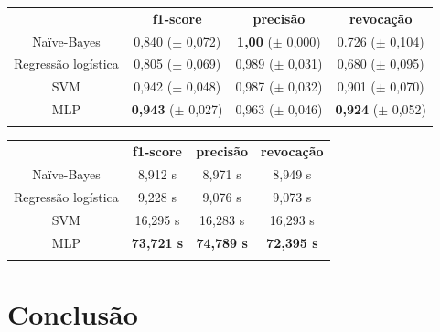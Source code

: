 \documentclass[a4paper,11pt]{article}
\begin{document}
\vspace{.5cm}
\begin{center}
\begin{tabular}{cccc}
 \hline
	        &  \textbf{f1-score}  & \textbf{precisão}  & \textbf{revocação} \\
 Naïve-Bayes	&  0,840 ($\pm$ 0,072) & \textbf{1,00} ($\pm$ 0,000)  & 0.726 ($\pm$ 0,104) \\
 Regressão logística & 0,805 ($\pm$ 0,069) & 0,989 ($\pm$ 0,031) & 0,680 ($\pm$ 0,095) \\
 SVM            &  0,942 ($\pm$ 0,048) & 0,987 ($\pm$ 0,032) & 0,901 ($\pm$ 0,070)  \\
 MLP 		&  \textbf{0,943} ($\pm$ 0,027) & 0,963 ($\pm$ 0,046) & \textbf{0,924} ($\pm$ 0,052)  \\
 \hline
 \label{tab:metrics}
\end{tabular}
\end{center}





\vspace{.5cm}
\begin{center}
\begin{tabular}{cccc}
 \hline
	        &  \textbf{f1-score}  & \textbf{precisão}  & \textbf{revocação} \\
 Naïve-Bayes	&  8,912 s 	 & 8,971 s  	& 8,949 s \\
 Regressão logística & 9,228 s 	 & 9,076 s  	& 9,073 s  \\
 SVM            &  16,295 s 	 & 16,283 s 	& 16,293 s \\
 MLP 		&  \textbf{73,721 s}  & \textbf{74,789 s}   & \textbf{72,395 s}  \\
 \hline
 \label{tab:tempo}
\end{tabular}
\end{center}




\section{Conclusão}
\end{document}
